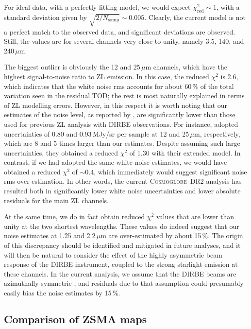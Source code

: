 \documentclass[twocolumn]{aa}
\newcommand{\cosmoglobe}{\textsc{Cosmoglobe}}
\begin{document}
For ideal data, with a perfectly fitting model, we would
expect $\chi^2_{\mathrm{red}}\sim 1$, with a standard deviation given
by $\sqrt{2/N_{\mathrm{samp}}}\sim0.005$. Clearly, the current model
is not a perfect match to the observed data, and significant
deviations are observed. Still, the values are for several channels
very close to unity, namely 3.5, 140, and 240$\,\mu$m.

The biggest outlier is obviously the 12 and 25$\,\mu$m channels, which
have the highest signal-to-noise ratio to ZL emission. In this case,
the reduced $\chi^2$ is 2.6, which indicates that the white noise rms
accounts for about 60\,\% of the total variation seen in the residual
TOD; the rest is most naturally explained in terms of ZL modelling
errors. However, in this respect it is worth noting that our estimates
of the noise level, as reported by \citet{CG02_01}, are
significantly lower than those used for previous ZL analysis with
DIRBE observations. For instance, \citet{Robinson2013} adopted
uncertainties of 0.80 and 0.93\,MJy/sr per sample at 12 and
25$\,\mu$m, respectively, which are 8 and 5 times larger than our
estimates. Despite assuming such large uncertainties, they obtained a
reduced $\chi^2$ of 1.30 with their extended model. In contrast, if we
had adopted the same white noise estimates, we would have obtained a
reduced $\chi^2$ of $\sim0.4$, which immediately would suggest
significant noise rms over-estimation. In other words, the current
\cosmoglobe\ DR2 analysis has resulted both in significantly lower
white noise uncertainties and lower absolute residuals for the main ZL
channels.

At the same time, we do in fact obtain reduced $\chi^2$ values that are
lower than unity at the two shortest wavelengths. These values do
indeed suggest that our noise estimates at 1.25 and 2.2$\,\mu$m are
over-estimated by about 15\,\%. The origin of this discrepancy should
be identified and mitigated in future analyses, and it will then be
natural to consider the effect of the highly asymmetric beam response
of the DIRBE instrument, coupled to the strong starlight emission at
these channels. In the current analysis, we assume that the DIRBE
beams are azimuthally symmetric \citep{CG02_01}, and residuals due to
that assumption could presumably easily bias the noise estimates by
15\,\%. 


\subsection{Comparison of ZSMA maps}
\end{document}
